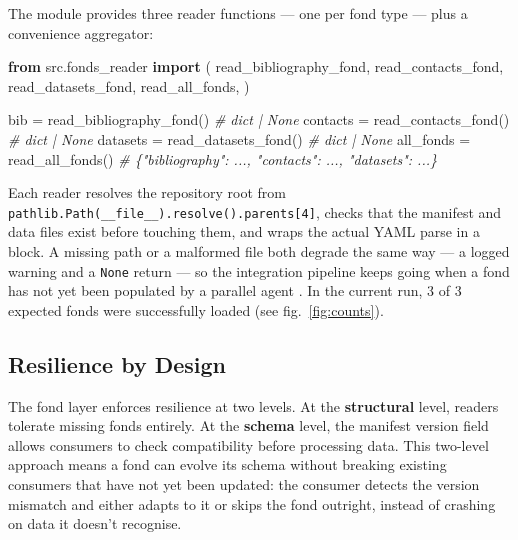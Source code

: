 \documentclass[
]{article}
\newenvironment{Shaded}{}{}
\newcommand{\CommentTok}[1]{\textcolor[rgb]{0.38,0.63,0.69}{\textit{#1}}}
\newcommand{\ImportTok}[1]{\textcolor[rgb]{0.00,0.50,0.00}{\textbf{#1}}}
\newcommand{\NormalTok}[1]{#1}
\newcommand{\OperatorTok}[1]{\textcolor[rgb]{0.40,0.40,0.40}{#1}}
\begin{document}
The  module provides three reader functions
--- one per fond type --- plus a convenience aggregator:

\begin{Shaded}
\begin{Highlighting}[]
\ImportTok{from}\NormalTok{ src.fonds\_reader }\ImportTok{import}\NormalTok{ (}
\NormalTok{    read\_bibliography\_fond,}
\NormalTok{    read\_contacts\_fond,}
\NormalTok{    read\_datasets\_fond,}
\NormalTok{    read\_all\_fonds,}
\NormalTok{)}

\NormalTok{bib      }\OperatorTok{=}\NormalTok{ read\_bibliography\_fond()   }\CommentTok{\# dict | None}
\NormalTok{contacts }\OperatorTok{=}\NormalTok{ read\_contacts\_fond()       }\CommentTok{\# dict | None}
\NormalTok{datasets }\OperatorTok{=}\NormalTok{ read\_datasets\_fond()       }\CommentTok{\# dict | None}
\NormalTok{all\_fonds }\OperatorTok{=}\NormalTok{ read\_all\_fonds()          }\CommentTok{\# \{"bibliography": ..., "contacts": ..., "datasets": ...\}}
\end{Highlighting}
\end{Shaded}

Each reader resolves the repository root from
\texttt{pathlib.Path(\_\_file\_\_).resolve().parents{[}4{]}}, checks
that the manifest and data files exist before touching them, and wraps
the actual YAML parse in a
block. A missing path or a malformed file both degrade the same way ---
a logged warning and a \texttt{None} return --- so the integration
pipeline keeps going when a fond has not yet been populated by a
parallel agent \citep{Taschuk2017ten}. In the current run, 3 of 3
expected fonds were successfully loaded (see fig.~\ref{fig:counts}).

\subsection{Resilience by Design}\label{resilience-by-design}

The fond layer enforces resilience at two levels. At the
\textbf{structural} level, readers tolerate missing fonds entirely. At
the \textbf{schema} level, the manifest version field allows consumers
to check compatibility before processing data. This two-level approach
means a fond can evolve its schema without breaking existing consumers
that have not yet been updated: the consumer detects the version
mismatch and either adapts to it or skips the fond outright, instead of
crashing on data it doesn't recognise.
\end{document}
